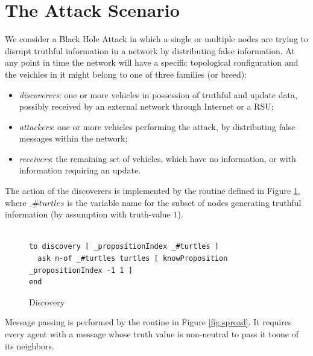 \documentclass[compsoc, conference, letterpaper, 10pt, times]{IEEEtran}
\begin{document}
\section{The Attack Scenario}\label{sec:attack}

We consider a Black Hole Attack in which a single or multiple nodes are trying to disrupt truthful information in a network by distributing false information. At any point in time the network will have a specific topological configuration and the veichles in it might belong to one of three families (or breed):

\begin{itemize}
\item \textit{discoverers}: one or more vehicles in possession of truthful and update data, possibly received by an external network through Internet or a RSU;
\item \textit{attackers}: one or more vehicles performing the attack, by distributing false messages within the network;
\item \textit{receivers}: the remaining set of vehicles, which have no information, or with information requiring an update.
\end{itemize}

The action of the discoverers is implemented by the routine defined in Figure \ref{fig:discovery}, where \texttt{$\_\#turtles$} is the variable name for the subset of nodes generating truthful information (by assumption with truth-value $1$).

\begin{figure}[t]
 	\lstset{language=Java,
 		basicstyle=\scriptsize,
 		mathescape}
 	\begin{lstlisting}[frame=single]  % Start your code-block

to discovery [ _propositionIndex _#turtles ]
  ask n-of _#turtles turtles [ knowProposition _propositionIndex -1 1 ]
end
\end{lstlisting}
\caption{Discovery}\label{fig:discovery}
%
\end{figure}
Message passing is performed by the routine in Figure \ref{fig:spread}. It requires every agent with a message whose truth value is non-neutral to pass it toone of its neighbors.
\end{document}
